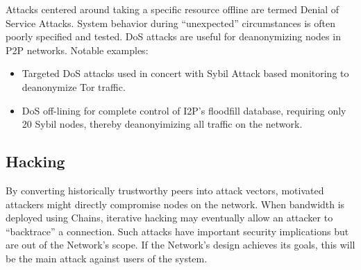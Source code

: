 Attacks centered around taking a specific resource offline are termed Denial of Service Attacks. System behavior during “unexpected” circumstances is often poorly specified and tested. DoS attacks are useful for deanonymizing nodes in P2P networks. Notable examples:

\begin{itemize}
\item Targeted DoS attacks used in concert with Sybil Attack based monitoring to deanonymize Tor traffic\cite{DOSvsSec}.
\item DoS off-lining for complete control of I2P’s floodfill database, requiring only 20 Sybil nodes, thereby deanonyimizing all traffic on the network\cite{I2P-vigna}.
\end{itemize}

\subsection{Hacking}

By converting historically trustworthy peers into attack vectors, motivated attackers might directly compromise nodes on the network. When bandwidth is deployed using Chains, iterative hacking may eventually allow an attacker to ``backtrace'' a connection. Such attacks have important security implications but are out of the \Orchid{} Network's scope. If the \Orchid{} Network's design achieves its goals, this will be the main attack against users of the system.
